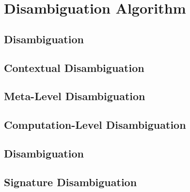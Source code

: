 \chapter{Disambiguation Algorithm}


\section{\LF Disambiguation}







\section{Contextual \LF Disambiguation}







\section{Meta-Level Disambiguation}







\section{Computation-Level Disambiguation}









\section{\Harpoon Disambiguation}

\section{\Beluga Signature Disambiguation}



